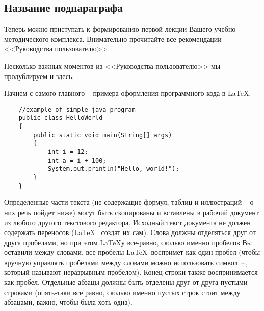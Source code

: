 \subsection{Название подпараграфа}%

Теперь можно приступать к формированию первой лекции Вашего учебно-методического
комплекса. Внимательно прочитайте все рекомендации <<Руководства пользователю>>.

Несколько важных моментов из <<Руководства пользователю>> мы продублируем и здесь.

Начнем с самого главного -- примера оформления программного кода в \LaTeX:

\begin{lstlisting}
    //example of simple java-program
    public class HelloWorld
    {
        public static void main(String[] args)
        {
            int i = 12;
            int a = i + 100;
            System.out.println("Hello, world!");
        }
    }
\end{lstlisting}

Определенные части текста (не содержащие формул, таблиц и иллюстраций -- о них речь пойдет
ниже) могут быть скопированы и вставлены  в рабочий документ из любого
другого текстового редактора. Исходный текст документа не должен содержать переносов
(\LaTeX~ создат их сам). Слова должны отделяться
друг от друга пробелами, но при этом \LaTeX у все-равно, сколько именно пробелов Вы
оставили между
словами, все пробелы \LaTeX~воспримет как один пробел
 (чтобы вручную управлять пробелами между словами можно использовать символ
$\sim$, который называют неразрывным пробелом).
 Конец строки также воспринимается как пробел.
Отдельные абзацы должны быть отделены друг от друга пустыми строками (опять-таки все равно,
сколько именно пустых строк стоит между абзацами, важно, чтобы была хоть одна).

